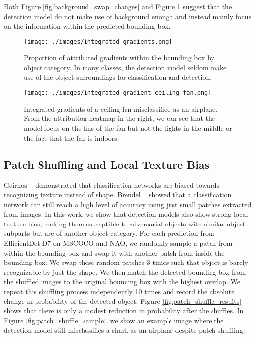 \documentclass[final]{cvpr}
\begin{document}
Both Figure \ref{fig:background_swap_changes} and Figure \ref{fig:integrated_gradients_boxplot} suggest that the detection model do not make use of background enough and instead mainly focus on the information within the predicted bounding box.



\begin{figure}[t]
\begin{center}
   \texttt{[image: ./images/integrated-gradients.png]}
\end{center}
   \caption{Proportion of attributed gradients within the bounding box by object category. In many classes, the detection model seldom make use of the object surroundings for classification and detection.}
\label{fig:long}
\label{fig:onecol}
\label{fig:integrated_gradients_boxplot}
\end{figure}

\begin{figure}[t]
\begin{center}
  \texttt{[image: ./images/integrated-gradient-ceiling-fan.png]}
\end{center}
  \caption{Integrated gradients of a ceiling fan misclassified as an airplane. From the attribution heatmap in the right, we can see that the model focus on the fins of the fan but not the lights in the middle or the fact that the fan is indoors.}
\label{fig:long}
\label{fig:onecol}
\label{fig:integrated_gradients_samples}
\end{figure}





\subsection{Patch Shuffling and Local Texture Bias}

Geirhos \etal~\cite{geirhos2018imagenettrained} demonstrated that classification networks are biased towards recognizing texture instead of shape. Brendel \etal~\cite{brendel2018approximating} showed that a classification network can still reach a high level of accuracy using just small patches extracted from images. In this work, we show that detection models also show strong local texture bias, making them susceptible to adversarial objects with similar object subparts but are of another object category. For each prediction from EfficientDet-D7 on MSCOCO and NAO, we randomly sample a patch from within the bounding box and swap it with another patch from inside the bounding box. We swap these random patches 3 times such that object is barely recognizable by just the shape. We then match the detected bounding box from the shuffled images to the original bounding box with the highest overlap. We repeat this shuffling process independently 10 times and record the absolute change in probability of the detected object. Figure \ref{fig:patch_shuffle_results} shows that there is only a modest reduction in probability after the shuffles. In Figure \ref{fig:patch_shuffle_sample}, we show an example image where the detection model still misclassifies a shark as an airplane despite patch shuffling.
\end{document}
